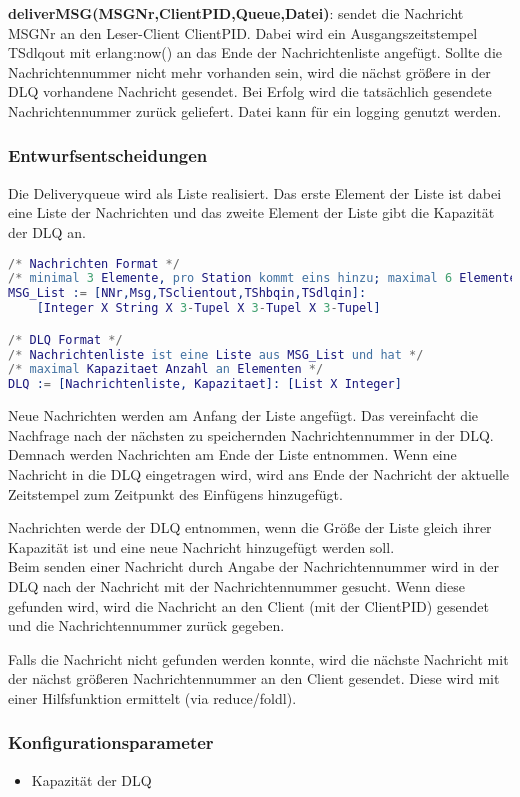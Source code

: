 \documentclass{article}
\begin{document}
\textbf{deliverMSG(MSGNr,ClientPID,Queue,Datei)}: sendet die Nachricht MSGNr an den Leser-Client ClientPID. Dabei wird ein Ausgangszeitstempel TSdlqout mit erlang:now() an das Ende der Nachrichtenliste angefügt. Sollte die Nachrichtennummer nicht mehr vorhanden sein, wird die nächst größere in der DLQ vorhandene Nachricht gesendet. Bei Erfolg wird die tatsächlich gesendete Nachrichtennummer zurück geliefert. Datei kann für ein logging genutzt werden.\\

\subsubsection{Entwurfsentscheidungen}
Die Deliveryqueue wird als Liste realisiert. Das erste Element der Liste ist dabei eine Liste der Nachrichten und das zweite Element der Liste gibt die Kapazität der DLQ an.
\begin{lstlisting}[language=erlang]
/* Nachrichten Format */
/* minimal 3 Elemente, pro Station kommt eins hinzu; maximal 6 Elemente */
MSG_List := [NNr,Msg,TSclientout,TShbqin,TSdlqin]:
    [Integer X String X 3-Tupel X 3-Tupel X 3-Tupel]

/* DLQ Format */
/* Nachrichtenliste ist eine Liste aus MSG_List und hat */
/* maximal Kapazitaet Anzahl an Elementen */
DLQ := [Nachrichtenliste, Kapazitaet]: [List X Integer]
\end{lstlisting}

Neue Nachrichten werden am Anfang der Liste angefügt. Das vereinfacht die Nachfrage nach der nächsten zu speichernden Nachrichtennummer in der DLQ. Demnach werden Nachrichten am Ende der Liste entnommen. Wenn eine Nachricht in die DLQ eingetragen wird, wird ans Ende der Nachricht der aktuelle Zeitstempel zum Zeitpunkt des Einfügens hinzugefügt.

Nachrichten werde der DLQ entnommen, wenn die Größe der Liste gleich ihrer Kapazität ist und eine neue Nachricht hinzugefügt werden soll.\\

Beim senden einer Nachricht durch Angabe der Nachrichtennummer wird in der DLQ nach der Nachricht mit der Nachrichtennummer gesucht. Wenn diese gefunden wird, wird die Nachricht an den Client (mit der ClientPID) gesendet und die Nachrichtennummer zurück gegeben.

Falls die Nachricht nicht gefunden werden konnte, wird die nächste Nachricht mit der nächst größeren Nachrichtennummer an den Client gesendet. Diese wird mit einer Hilfsfunktion ermittelt (via reduce/foldl).

\subsubsection{Konfigurationsparameter}
\begin{itemize}
    \item Kapazität der DLQ
\end{itemize}
\end{document}

